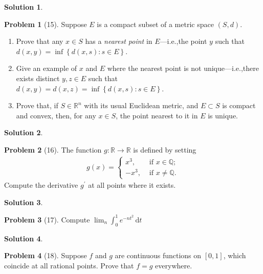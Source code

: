 \documentclass[12pt]{article}
\theoremstyle{definition} %
\newtheorem{solution}{Solution}
\newtheorem{problem}{Problem}
\theoremstyle{plain} %
\begin{document}
\begin{solution}
    
\end{solution}
\begin{problem}[15]
   Suppose $E$ is a compact subset of a metric space $(S,d)$. 
   \begin{enumerate}
    \item Prove that any $x\in S$ has a \emph{nearest point} in $E$—i.e.,the point $y$ such that $d(x,y)=\inf \left\{ d(x,s):s\in E \right\} $.
    \item Give an example of $x$ and $E$ where the nearest point is not unique—i.e.,there exists distinct $y,z\in E$ such that $d(x,y)=d(x,z)=\inf \left\{ d(x,s) : s\in E \right\} $.
    \item Prove that, if $S\in \mathbb{{R}}^{n}$ with its usual Euclidean metric, and $E \subset S$ is compact and convex, then, for any $x\in S$, the point nearest to it in $E$ is unique.
   \end{enumerate} 
\end{problem}
\begin{solution}
    
\end{solution}
\begin{problem}[16]
    The function $g: \mathbb{{R}}\to \mathbb{{R}}$ is defined by setting 
    \begin{align}
        g(x) = \begin{cases}
            x^{3}, &\text{ if }  x\in \mathbb{{Q}};\\
            -x^{3}, &\text{ if }  x \neq \mathbb{{Q}}.
        \end{cases}
    \end{align}  
   Compute the derivative $g^\prime $ at all points where it exists.  
\end{problem}
\begin{solution}
    
\end{solution}
\begin{problem}[17]
   Compute $\lim_{n} \int_{0}^{1} e^{-nt^{2}} \,\mathrm{d}t $  
\end{problem}
\begin{solution}
    
\end{solution}
\begin{problem}[18]
   Suppose $f$ and $g$ are continuous functions on $[0,1]$, which coincide at all rational points. Prove that $f=g$ everywhere.  
\end{problem}
\end{document}
